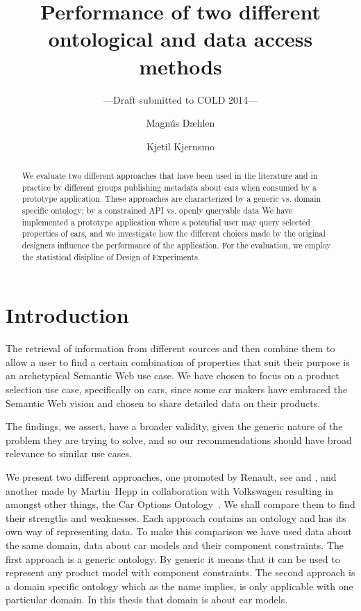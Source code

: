 \documentclass{llncs}
\title{Performance of two different ontological and data access methods}
\author{Magn\'{u}s D\ae hlen \and Kjetil Kjernsmo}
\institute{Department of Informatics,
Postboks 1080 Blindern,
N-0316 Oslo, Norway \email{\{magnudae,kjekje\}@ifi.uio.no} }
\subtitle{---Draft submitted to COLD 2014---}
\begin{document}
\maketitle

\begin{abstract}
  We evaluate two different approaches that have been used in the
  literature and in practice by different groups publishing metadata
  about cars when consumed by a prototype application. These
  approaches are characterized by a generic vs. domain specific
  ontology; by a constrained API vs. openly queryable data %
  We have implemented a prototype application where a potential user
  may query selected properties of cars, and we investigate how the
  different choices made by the original designers influence the
  performance of the application. For the evaluation, we employ
  the statistical disipline of Design of Experiments. 

\end{abstract}

\section{Introduction}

The retrieval of information from different sources and then combine
them to allow a user to find a certain combination of properties that
suit their purpose is an archetypical Semantic Web use case. We have
chosen to focus on a product selection use case, specifically on cars,
since some car makers have embraced the Semantic Web vision and chosen
to share detailed data on their products.

The findings, we assert, have a broader validity, given the generic
nature of the problem they are trying to solve, and so our
recommendations should have broad relevance to similar use cases.

We present two different approaches, one promoted by Renault, see
\cite{SemWebAppRes} and \cite{ren1}, and another made by Martin~Hepp
in collaboration with Volkswagen resulting in amongst other things,
the Car Options Ontology~\cite{COO}. We shall compare them to find
their strengths and weaknesses. Each approach contains an ontology and
has its own way of representing data.  To make this comparison we have
used data about the same domain, data about car models and their
component constraints.  The first approach is a generic ontology. By
generic it means that it can be used to represent any product model
with component constraints. The second approach is a domain specific
ontology which as the name implies, is only applicable with one
particular domain. In this thesis that domain is about car models.
\end{document}
